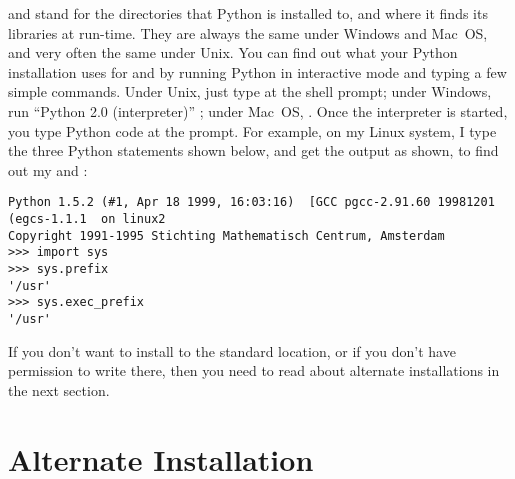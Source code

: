 \documentclass{howto}
\begin{document}
 and  stand for the directories
that Python is installed to, and where it finds its libraries at
run-time.  They are always the same under Windows and Mac~OS, and very
often the same under Unix.  You can find out what your Python
installation uses for  and  by
running Python in interactive mode and typing a few simple commands.
Under Unix, just type  at the shell prompt; under Windows,
run ``Python 2.0 (interpreter)'' ; under Mac~OS, .
Once the interpreter is started, you type Python code at the
\samp{>>> } prompt.  For example, on my Linux system, I type the three
Python statements shown below, and get the output as shown, to find
out my  and :

\begin{verbatim}
Python 1.5.2 (#1, Apr 18 1999, 16:03:16)  [GCC pgcc-2.91.60 19981201 (egcs-1.1.1  on linux2
Copyright 1991-1995 Stichting Mathematisch Centrum, Amsterdam
>>> import sys
>>> sys.prefix
'/usr'
>>> sys.exec_prefix
'/usr'
\end{verbatim}

If you don't want to install to the standard location, or if you don't
have permission to write there, then you need to read about alternate
installations in the next section.



\newcommand{\installscheme}[8]
  {\begin{tableiii}{lll}{textrm}
          {Type of file}
          {Installation Directory}
          {Override option}
     \lineiii{pure module distribution}
             {\filevar{#1}\filenq{#2}}
             {\longprogramopt{install-purelib}}
     \lineiii{non-pure module distribution}
             {\filevar{#3}\filenq{#4}}
             {\longprogramopt{install-platlib}}
     \lineiii{scripts}
             {\filevar{#5}\filenq{#6}}
             {\longprogramopt{install-scripts}}
     \lineiii{data}
             {\filevar{#7}\filenq{#8}}
             {\longprogramopt{install-data}}
   \end{tableiii}}

\section{Alternate Installation}
\label{alt-install}
\end{document}
